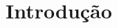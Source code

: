 \documentclass[a4paper,12pt,twoside,english,brazilian]{book}
\begin{document}

\chapter{Introdução}
\label{cap:introducao}
\end{document}
